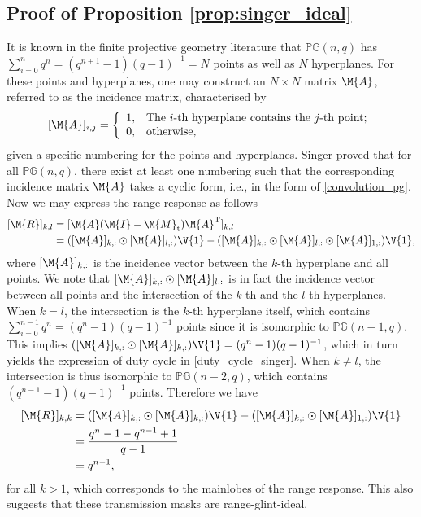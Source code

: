 \documentclass[journal,a4paper,10pt, romanappendices]{IEEEtran}
\begin{document}
\subsection{Proof of Proposition \ref{prop:singer_ideal}}\label{sec:proof_singer_ideal}
\begin{IEEEproof}
It is known in the finite projective geometry literature \cite{singer1938theorem} that $\mathbb{PG}(n,q)$ has $\sum_{i=0}^n q^n = (q^{n+1}-1)(q-1)^{-1}=N$ points as well as $N$ hyperplanes. For these points and hyperplanes, one may construct an $N\times N$ matrix $\M{A}$, referred to as the incidence matrix, characterised by
$$
[\M{A}]_{i,j} = \left\{
  \begin{array}{ll}
    1, & \hbox{The $i$-th hyperplane contains the $j$-th point;} \\
    0, & \hbox{otherwise,}
  \end{array}
\right.
$$
given a specific numbering for the points and hyperplanes. Singer \cite{singer1938theorem} proved that for all $\mathbb{PG}(n,q)$, there exist at least one numbering such that the corresponding incidence matrix $\M{A}$ takes a cyclic form, i.e., in the form of \eqref{convolution_pg}. Now we may express the range response as follows
$$
\begin{aligned}
\relax[\M{R}]_{k,l} &= [\M{A}(\M{I}-\M{M}_{\rm t})\M{A}^{\rm T}]_{k,l} \\
&= ([\M{A}]_{k,:} \odot [\M{A}]_{l,:})\V{1} - ([\M{A}]_{k,:} \odot [\M{A}]_{l,:} \odot [\M{A}]_{1,:})\V{1},
\end{aligned}
$$
where $[\M{A}]_{k,:}$ is the incidence vector between the $k$-th hyperplane and all points. We note that $[\M{A}]_{k,:} \odot [\M{A}]_{l,:}$ is in fact the incidence vector between all points and the intersection of the $k$-th and the $l$-th hyperplanes. When $k=l$, the intersection is the $k$-th hyperplane itself, which contains $\sum_{i=0}^{n-1} q^n = (q^n-1)(q-1)^{-1}$ points since it is isomorphic to $\mathbb{PG}(n-1,q)$. This implies $([\M{A}]_{k,:} \odot [\M{A}]_{k,:})\V{1}=(q^n-1)(q-1)^{-1}$, which in turn yields the expression of duty cycle in \eqref{duty_cycle_singer}. When $k\neq l$, the intersection is thus isomorphic to $\mathbb{PG}(n-2,q)$, which contains $(q^{n-1}-1)(q-1)^{-1}$ points. Therefore we have
$$
\begin{aligned}
\relax[\M{R}]_{k,k} &= ([\M{A}]_{k,:} \odot [\M{A}]_{k,:})\V{1} - ([\M{A}]_{k,:} \odot [\M{A}]_{1,:})\V{1}\\
&=\frac{q^n-1 - q^{n-1} +1}{q-1}\\
&=q^{n-1},
\end{aligned}
$$
for all $k>1$, which corresponds to the mainlobes of the range response. This also suggests that these transmission masks are range-glint-ideal.


\end{IEEEproof}
\end{document}
